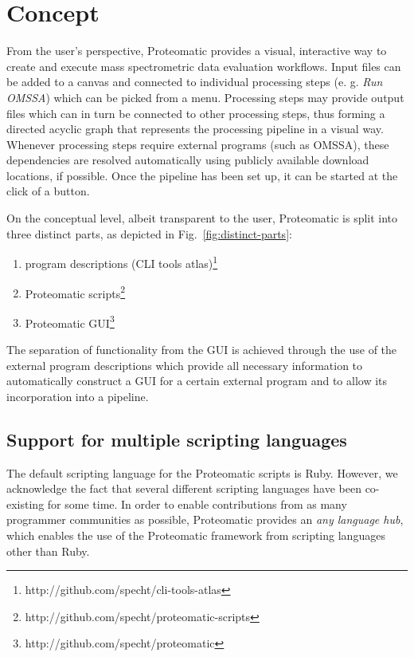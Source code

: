 \section{Concept}

From the user's perspective, Proteomatic provides a visual, interactive way to 
create and execute mass spectrometric data evaluation workflows.
Input files can be added to a canvas and connected to individual processing 
steps (e. g. {\em Run OMSSA}) which can be picked from a menu. 
Processing steps may provide output files which can in turn be connected to 
other processing steps, thus forming a directed acyclic graph that represents 
the processing pipeline in a visual way.
Whenever processing steps require external programs (such as OMSSA), these 
dependencies are resolved automatically using publicly available download 
locations, if possible.
Once the pipeline has been set up, it can be started at the click of a button.

On the conceptual level, albeit transparent to the user, Proteomatic is split into 
three distinct parts, as depicted in Fig.~\ref{fig:distinct-parts}:

\begin{enumerate}
\item program descriptions (CLI tools atlas)\footnote{http://github.com/specht/cli-tools-atlas}
\item Proteomatic scripts\footnote{http://github.com/specht/proteomatic-scripts}
\item Proteomatic GUI\footnote{http://github.com/specht/proteomatic}
\end{enumerate}

The separation of functionality from the GUI is achieved through the use of
the external program descriptions which provide all necessary information to
automatically construct a GUI for a certain external program and to allow
its incorporation into a pipeline.

\subsection{Support for multiple scripting languages}

The default scripting language for the Proteomatic scripts is Ruby.
However, we acknowledge the fact that several different scripting languages 
have been co-existing for some time.
In order to enable contributions from as many programmer communities as possible, 
Proteomatic provides an {\em any language hub}, which enables the use of the 
Proteomatic framework from scripting languages other than Ruby.

